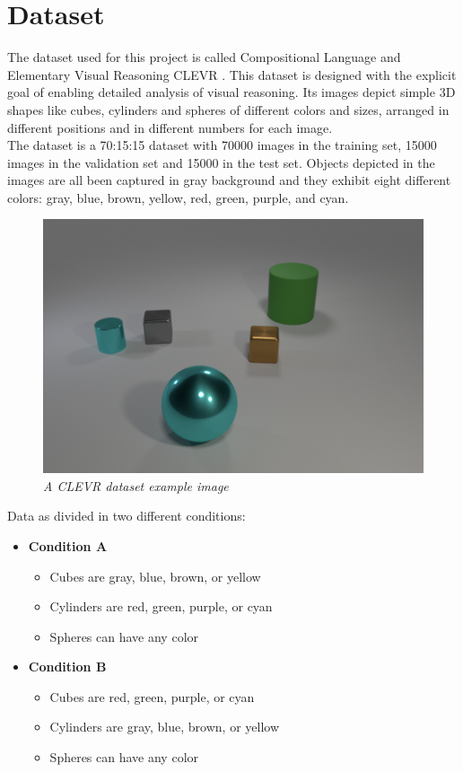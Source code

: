 \documentclass[10pt,twocolumn,letterpaper]{article}
\begin{document}
\section{Dataset}
 The dataset used for this project is called Compositional Language and Elementary
   Visual Reasoning CLEVR .
  This dataset is designed with the explicit goal of enabling
  detailed analysis of visual reasoning. Its images depict
  simple 3D shapes like cubes, cylinders and spheres of different colors and sizes,
  arranged in different positions and in different numbers for each image.
  \\The dataset is a 70:15:15 dataset with 70000 images in the training set,
  15000 images in the validation set and 15000 in the test set.
  Objects depicted in the images are all been captured in gray background and
  they exhibit eight different colors:
   gray, blue, brown, yellow, red, green, purple, and cyan.
  \begin{figure}[t] %
  \centering
  \includegraphics[scale=0.40]{images/datasetEx.png}
  \caption{\textit{A CLEVR dataset example image}}
  \label{datasetEx}
  \end{figure}
  Data as divided in two different conditions:
  \begin{itemize}
    \item \textbf{Condition A}
    \begin{itemize}
      \item Cubes are gray, blue, brown, or yellow
      \item Cylinders are red, green, purple, or cyan
      \item Spheres can have any color
    \end{itemize}
    \item  \textbf{Condition B}
    \begin{itemize}
      \item Cubes are red, green, purple, or cyan
      \item Cylinders are gray, blue, brown, or yellow
      \item Spheres can have any color
    \end{itemize}
  \end{itemize}
\end{document}
